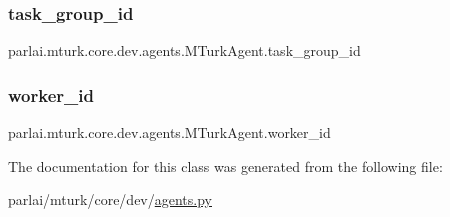 \subsubsection{\texorpdfstring{task\+\_\+group\+\_\+id}{task\_group\_id}}
{\footnotesize\ttfamily parlai.\+mturk.\+core.\+dev.\+agents.\+M\+Turk\+Agent.\+task\+\_\+group\+\_\+id}

\mbox{\label{classparlai_1_1mturk_1_1core_1_1dev_1_1agents_1_1MTurkAgent_a226a367f5473cbf5689ed91043ceb097}} 
\subsubsection{\texorpdfstring{worker\+\_\+id}{worker\_id}}
{\footnotesize\ttfamily parlai.\+mturk.\+core.\+dev.\+agents.\+M\+Turk\+Agent.\+worker\+\_\+id}



The documentation for this class was generated from the following file\+:\begin{DoxyCompactItemize}
\item 
parlai/mturk/core/dev/\hyperlink{parlai_2mturk_2core_2dev_2agents_8py}{agents.\+py}\end{DoxyCompactItemize}
